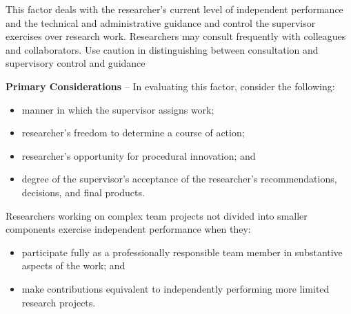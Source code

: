 %
%

This factor deals with the researcher’s current level of independent performance and the technical and administrative guidance and control the supervisor exercises over research work. 
Researchers may consult frequently with colleagues and collaborators.
Use caution in distinguishing between consultation and supervisory control and guidance

\textbf{Primary Considerations} -- In evaluating this factor, consider
the following:

\begin{itemize}
\item manner in which the supervisor assigns work;
\item researcher's freedom to determine a course of action; 
\item researcher's opportunity for procedural innovation; and 
\item degree of the supervisor's acceptance of the researcher's recommendations, decisions, and 
  final products.
\end{itemize}
Researchers working on complex team projects not divided into smaller components exercise 
independent performance when they:
\begin{itemize}
\item participate fully as a professionally responsible team member in substantive aspects of the 
  work; and 
\item make contributions equivalent to independently performing more
  limited research projects.
\end{itemize}

